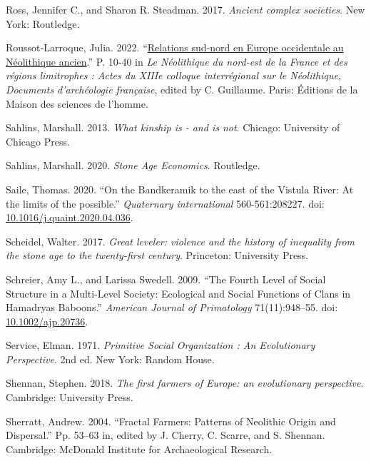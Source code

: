 \documentclass[
  12pt,
]{book}
\newlength{\cslhangindent}
\newlength{\cslentryspacingunit} %
\newenvironment{CSLReferences}[2] %
 {%
  \setlength{\parindent}{0pt}
  \ifodd #1
  \let\oldpar\par
  \def\par{\hangindent=\cslhangindent\oldpar}
  \fi
  \setlength{\parskip}{#2\cslentryspacingunit}
 }%
 {}
\begin{document}
\begin{CSLReferences}{1}{0}
\leavevmode{}%
Ross, Jennifer C., and Sharon R. Steadman. 2017. \emph{Ancient complex societies}. New York: Routledge.

\leavevmode{}%
Roussot‑Larroque, Julia. 2022. {``\href{https://doi.org/10.4000/books.editionsmsh.39018}{Relations sud‑nord en Europe occidentale au Néolithique ancien}.''} P. 10‑40 in \emph{Le Néolithique du nord-est de la France et des régions limitrophes : Actes du XIIIe colloque interrégional sur le Néolithique}, \emph{Documents d'archéologie française}, edited by C. Guillaume. {Paris}: {Éditions de la Maison des sciences de l'homme}.

\leavevmode{}%
Sahlins, Marshall. 2013. \emph{What kinship is - and is not}. Chicago: University of Chicago Press.

\leavevmode{}%
Sahlins, Marshall. 2020. \emph{Stone Age Economics}. Routledge.

\leavevmode{}%
Saile, Thomas. 2020. {``On the Bandkeramik to the east of the Vistula River: At the limits of the possible.''} \emph{Quaternary international} 560-561:208227. doi: \href{https://doi.org/10.1016/j.quaint.2020.04.036}{10.1016/j.quaint.2020.04.036}.

\leavevmode{}%
Scheidel, Walter. 2017. \emph{Great leveler: violence and the history of inequality from the stone age to the twenty-first century}. Princeton: University Press.

\leavevmode{}%
Schreier, Amy L., and Larissa Swedell. 2009. {``The Fourth Level of Social Structure in a Multi-Level Society: Ecological and Social Functions of Clans in Hamadryas Baboons.''} \emph{American Journal of Primatology} 71(11):948--55. doi: \href{https://doi.org/10.1002/ajp.20736}{10.1002/ajp.20736}.

\leavevmode{}%
Service, Elman. 1971. \emph{Primitive Social Organization : An Evolutionary Perspective}. 2nd ed. New York: Random House.

\leavevmode{}%
Shennan, Stephen. 2018. \emph{The first farmers of Europe: an evolutionary perspective}. Cambridge: University Press.

\leavevmode{}%
Sherratt, Andrew. 2004. {``Fractal Farmers: Patterns of Neolithic Origin and Dispersal.''} Pp. 53--63 in, edited by J. Cherry, C. Scarre, and S. Shennan. Cambridge: McDonald Institute for Archaeological Research.


\end{CSLReferences}
\end{document}
